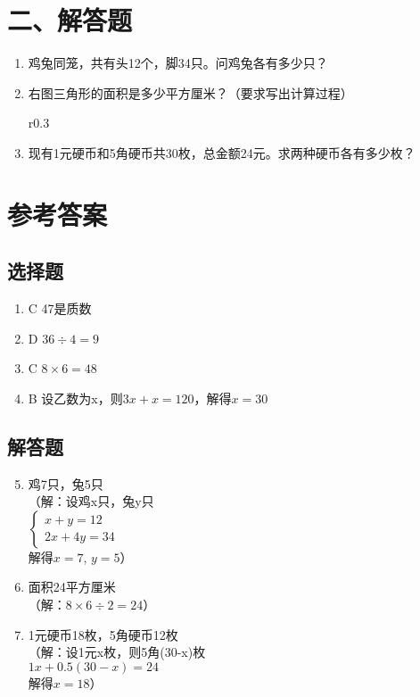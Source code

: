 \documentclass[14pt]{article}
\begin{document}
\section*{二、解答题}
\begin{enumerate}
\addtocounter{enumi}{4}

\item 鸡兔同笼，共有头12个，脚34只。问鸡兔各有多少只？
\vspace{6cm}

\item 右图三角形的面积是多少平方厘米？（要求写出计算过程）

\begin{wrapfigure}{r}{0.3\textwidth}
\centering
{}
\end{wrapfigure}
\vspace{6cm}

\item 现有1元硬币和5角硬币共30枚，总金额24元。求两种硬币各有多少枚？
\vspace{6cm}
\end{enumerate}

\newpage
\section*{参考答案}

\subsection*{选择题}
\begin{enumerate}
\item C \quad 47是质数
\item D \quad $36\div4=9$
\item C \quad $8\times6=48$
\item B \quad 设乙数为x，则$3x+x=120$，解得$x=30$
\end{enumerate}

\subsection*{解答题}
\begin{enumerate}
\setcounter{enumi}{4}
\item 鸡7只，兔5只\\
（解：设鸡x只，兔y只\\
$\begin{cases}
x+y=12 \\
2x+4y=34
\end{cases}$\\
解得$x=7$, $y=5$）

\item 面积24平方厘米\\
（解：$8\times6\div2=24$）

\item 1元硬币18枚，5角硬币12枚\\
（解：设1元x枚，则5角(30-x)枚\\
$1x + 0.5(30-x) = 24$\\
解得$x=18$）
\end{enumerate}
\end{document}
